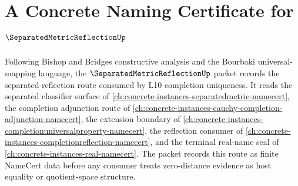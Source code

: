 \chapter{A Concrete Naming Certificate for $\SeparatedMetricReflectionUp$}
\label{ch:concrete-instances-separatedmetricreflection-namecert}

Following Bishop and Bridges constructive analysis and the Bourbaki universal-mapping language, the $\SeparatedMetricReflectionUp$ packet records the separated-reflection route consumed by L10 completion uniqueness. It reads the separated classifier surface of \autoref{ch:concrete-instances-separatedmetric-namecert}, the completion adjunction route of \autoref{ch:concrete-instances-cauchy-completion-adjunction-namecert}, the extension boundary of \autoref{ch:concrete-instances-completionuniversalproperty-namecert}, the reflection consumer of \autoref{ch:concrete-instances-completionreflection-namecert}, and the terminal real-name seal of \autoref{ch:concrete-instances-real-namecert}. The packet records this route as finite NameCert data before any consumer treats zero-distance evidence as host equality or quotient-space structure.

